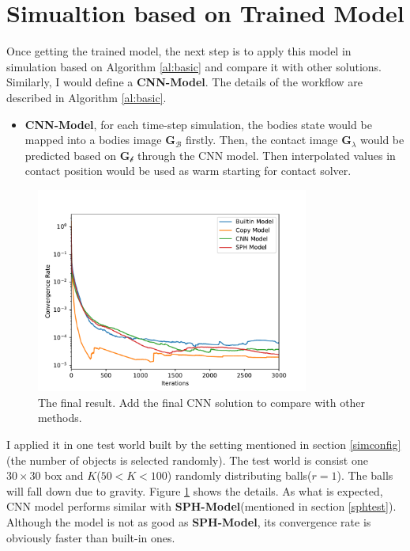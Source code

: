 \section{Simualtion based on Trained Model}
Once getting the trained model, the next step is to apply this model in simulation based on Algorithm \ref{al:basic} and compare it with other solutions. Similarly, I would define a \textbf{CNN-Model}. The details of the workflow are described in Algorithm \ref{al:basic}.
\begin{itemize}
    \item \textbf{CNN-Model}, for each time-step simulation, the bodies state would be mapped into a bodies image $\pmb{G}_{\mathcal{B}}$ firstly. Then, the contact image $\pmb{G}_{\lambda}$ would be predicted based on $\pmb{G}_{\mathcal{b}}$ through the CNN model. Then interpolated values in contact position would be used as warm starting for contact solver.
\end{itemize}
\begin{figure}[!h]
    \centering
    \includegraphics[width=0.8\textwidth]{Figures/cnn.pdf}
    \caption{The final result. Add the final CNN solution to compare with other methods.}
    \label{testoneworld}
\end{figure}

I applied it in one test world built by the setting mentioned in section \ref{simconfig}(the number of objects is selected randomly). The test world is consist one $30 \times 30 $ box and $K$($50<K<100$) randomly distributing balls($r=1$). The balls will fall down due to gravity. Figure \ref{testoneworld} shows the details. As what is expected, CNN model performs similar with \textbf{SPH-Model}(mentioned in section \ref{sphtest}). Although the model is not as good as \textbf{SPH-Model}, its convergence rate is obviously faster than built-in ones. 

